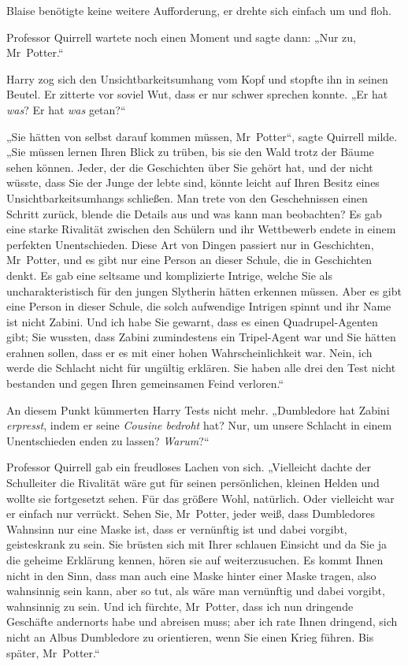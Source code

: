 {Blaise benötigte keine weitere Aufforderung, er drehte sich einfach um und floh.

Professor Quirrell wartete noch einen Moment und sagte dann: „Nur zu, Mr~Potter.“

Harry zog sich den Unsichtbarkeitsumhang vom Kopf und stopfte ihn in seinen Beutel. Er zitterte vor soviel Wut, dass er nur schwer sprechen konnte. „Er hat \emph{was}? Er hat \emph{was} getan?“

„Sie hätten von selbst darauf kommen müssen, Mr~Potter“, sagte Quirrell milde. „Sie müssen lernen Ihren Blick zu trüben, bis sie den Wald trotz der Bäume sehen können. Jeder, der die Geschichten über Sie gehört hat, und der nicht wüsste, dass Sie der Junge der lebte sind, könnte leicht auf Ihren Besitz eines Unsichtbarkeitsumhangs schließen. Man trete von den Geschehnissen einen Schritt zurück, blende die Details aus und was kann man beobachten? Es gab eine starke Rivalität zwischen den Schülern und ihr Wettbewerb endete in einem perfekten Unentschieden. Diese Art von Dingen passiert nur in Geschichten, Mr~Potter, und es gibt nur eine Person an dieser Schule, die in Geschichten denkt. Es gab eine seltsame und komplizierte Intrige, welche Sie als uncharakteristisch für den jungen Slytherin hätten erkennen müssen. Aber es gibt eine Person in dieser Schule, die solch aufwendige Intrigen spinnt und ihr Name ist nicht Zabini. Und ich habe Sie gewarnt, dass es einen Quadrupel-Agenten gibt; Sie wussten, dass Zabini zumindestens ein Tripel-Agent war und Sie hätten erahnen sollen, dass er es mit einer hohen Wahrscheinlichkeit war. Nein, ich werde die Schlacht nicht für ungültig erklären. Sie haben alle drei den Test nicht bestanden und gegen Ihren gemeinsamen Feind verloren.“

An diesem Punkt kümmerten Harry Tests nicht mehr. „Dumbledore hat Zabini \emph{erpresst}, indem er seine \emph{Cousine bedroht} hat? Nur, um unsere Schlacht in einem Unentschieden enden zu lassen? \emph{Warum}?“

Professor Quirrell gab ein freudloses Lachen von sich. „Vielleicht dachte der Schulleiter die Rivalität wäre gut für seinen persönlichen, kleinen Helden und wollte sie fortgesetzt sehen. Für das größere Wohl, natürlich. Oder vielleicht war er einfach nur verrückt. Sehen Sie, Mr~Potter, jeder weiß, dass Dumbledores Wahnsinn nur eine Maske ist, dass er vernünftig ist und dabei vorgibt, geisteskrank zu sein. Sie brüsten sich mit Ihrer schlauen Einsicht und da Sie ja die geheime Erklärung kennen, hören sie auf weiterzusuchen. Es kommt Ihnen nicht in den Sinn, dass man auch eine Maske hinter einer Maske tragen, also wahnsinnig sein kann, aber so tut, als wäre man vernünftig und dabei vorgibt, wahnsinnig zu sein. Und ich fürchte, Mr~Potter, dass ich nun dringende Geschäfte andernorts habe und abreisen muss; aber ich rate Ihnen dringend, sich nicht an Albus Dumbledore zu orientieren, wenn Sie einen Krieg führen. Bis später, Mr~Potter.“

}
